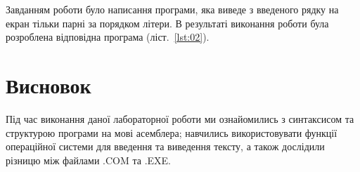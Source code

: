 \documentclass[a4paper,oneside,DIV=12,12pt]{scrartcl}
\begin{document}
		Завданням роботи було написання програми, яка виведе з введеного рядку на екран тільки парні за порядком літери. В результаті виконання роботи була розроблена відповідна програма (ліст.~\ref{lst:02}).
				
		
	\section{Висновок}
		Під час виконання даної лабораторної роботи ми ознайомились з синтаксисом та структурою програми на мові асемблера; навчились використовувати функції операційної системи для введення та виведення тексту, а також дослідили різницю між файлами .COM та .EXE.
\end{document}
